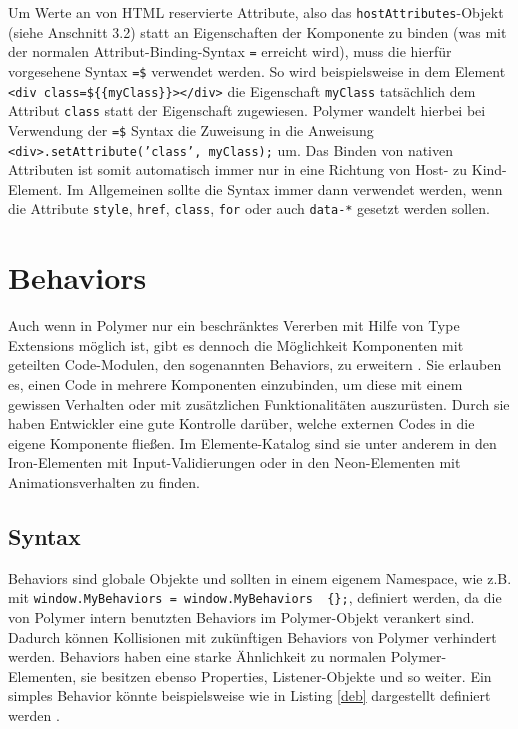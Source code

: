 Um Werte an von \ac{HTML} reservierte Attribute, also das \texttt{hostAttributes}-Objekt (siehe Anschnitt 3.2) statt an Eigenschaften der Komponente zu binden (was mit der normalen Attribut-Binding-Syntax \texttt{=} erreicht wird), muss die hierfür vorgesehene Syntax \texttt{=\$} verwendet werden. So wird beispielsweise in dem Element \texttt{\textless{}div\ class=\$\dq \{\{myClass\}\}\dq\textgreater{}\textless{}/div\textgreater{}} die Eigenschaft \texttt{myClass} tatsächlich dem Attribut \texttt{class} statt der Eigenschaft zugewiesen. Polymer wandelt hierbei bei Verwendung der \texttt{=\$} Syntax die Zuweisung in die Anweisung \texttt{\textless{}div\textgreater{}.setAttribute('class',\ myClass);} um. Das Binden von nativen Attributen ist somit automatisch immer nur in eine Richtung von Host- zu Kind-Element. Im Allgemeinen sollte die Syntax immer dann verwendet werden, wenn die Attribute \texttt{style}, \texttt{href}, \texttt{class}, \texttt{for} oder auch \texttt{data-*} gesetzt werden sollen.


\section{Behaviors}\label{behaviors}

Auch wenn in Polymer nur ein beschränktes Vererben mit Hilfe von Type Extensions möglich ist, gibt es dennoch die Möglichkeit Komponenten mit geteilten Code-Modulen, den sogenannten Behaviors, zu erweitern \cite{citeulike:13915080}. Sie erlauben es, einen Code in mehrere Komponenten einzubinden, um diese mit einem gewissen Verhalten oder mit zusätzlichen Funktionalitäten auszurüsten. Durch sie haben Entwickler eine gute Kontrolle darüber, welche externen Codes in die eigene Komponente fließen. Im Elemente-Katalog sind sie unter anderem in den Iron-Elementen mit Input-Validierungen oder in den Neon-Elementen mit Animationsverhalten zu finden.


\subsection{Syntax}\label{syntax}

Behaviors sind globale Objekte und sollten in einem eigenem Namespace, wie z.B. mit \texttt{window.MyBehaviors\ =\ window.MyBehaviors\ \textbar{}\textbar{}\ \{\};}, definiert werden, da die von Polymer intern benutzten Behaviors im
Polymer-Objekt verankert sind. Dadurch können Kollisionen mit zukünftigen Behaviors von Polymer verhindert werden. Behaviors haben eine starke Ähnlichkeit zu normalen Polymer-Elementen, sie besitzen ebenso Properties, Listener-Objekte und so weiter. Ein simples Behavior könnte beispielsweise wie in Listing \ref{deb} dargestellt definiert werden \cite{citeulike:13915079}.


